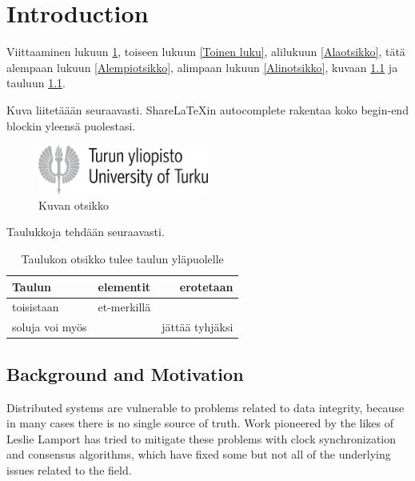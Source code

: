 \chapter{Introduction}
\label{Introduction}

Viittaaminen lukuun \ref{Introduction}, toiseen lukuun \ref{Toinen luku}, alilukuun \ref{Alaotsikko}, tätä alempaan lukuun \ref{Alempiotsikko}, alimpaan lukuun \ref{Alinotsikko}, kuvaan \ref{Kuva esimerkki} ja tauluun \ref{Taulu esimerkki}.

Kuva liitetäään seuraavasti. ShareLaTeXin autocomplete rakentaa koko begin-end blockin yleensä puolestasi.

\begin{figure}
\centering
\includegraphics[width=0.5\textwidth]{kuvat/turun_yliopisto_logo_rgb.png}
\caption{Kuvan otsikko}
\label{Kuva esimerkki}
\end{figure}

Taulukkoja tehdään seuraavasti.

\begin{table}
\centering
\caption{Taulukon otsikko tulee taulun yläpuolelle}
\begin{tabular}{l|c|r|}
 Taulun             &   elementit   & erotetaan \\
 \hline
 toisistaan         &   et-merkillä & \\
 soluja voi myös    &               & jättää tyhjäksi
\end{tabular}
\label{Taulu esimerkki}
\end{table}


\section{Background and Motivation}
\label{Background and Motivation}

Distributed systems are vulnerable to problems related to data integrity, because in many cases there is no single source of truth. Work pioneered by the likes of Leslie Lamport has tried to mitigate these problems with clock synchronization and consensus algorithms, which have fixed some but not all of the underlying issues related to the field.

